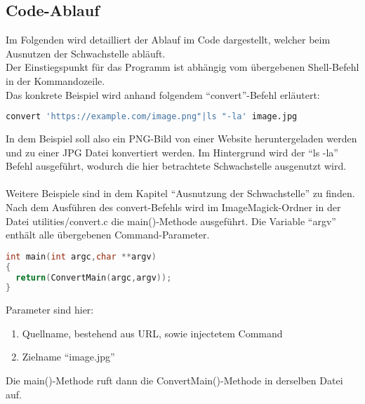 \subsection{Code-Ablauf}\label{subsec:code-ablauf}

Im Folgenden wird detailliert der Ablauf im Code dargestellt, welcher beim Ausnutzen der Schwachstelle abläuft.\\

Der Einstiegspunkt für das Programm ist abhängig vom übergebenen Shell-Befehl in der Kommandozeile.\\

Das konkrete Beispiel wird anhand folgendem "`convert"'-Befehl erläutert:

\begin{lstlisting}[language=Bash, caption=Beispielbefehl Codeablauf,label={lst:codeablaufbeispiel}]
convert 'https://example.com/image.png"|ls "-la' image.jpg
\end{lstlisting}
\vspace{5mm}

In dem Beispiel soll also ein PNG-Bild von einer Website heruntergeladen werden und zu einer JPG Datei konvertiert werden.
Im Hintergrund wird der "`ls -la"' Befehl ausgeführt, wodurch die hier betrachtete Schwachstelle ausgenutzt wird.\\\\
Weitere Beispiele sind in dem Kapitel "`Ausnutzung der Schwachstelle"' zu finden. \\

Nach dem Ausführen des convert-Befehls wird im ImageMagick-Ordner in der Datei utilities/convert.c die main()-Methode ausgeführt.
Die Variable "`argv"' enthält alle übergebenen Command-Parameter.\\

\begin{lstlisting}[firstnumber=90, language=C, caption=utilities/convert.c Einstieg main(),label={lst:lstlisting}]
int main(int argc,char **argv)
{
  return(ConvertMain(argc,argv));
}
\end{lstlisting}
\vspace{5mm}

Parameter sind hier:
\begin{enumerate}
  \item Quellname, bestehend aus URL, sowie injectetem Command
  \item Zielname "`image.jpg"'
\end{enumerate}

Die main()-Methode ruft dann die ConvertMain()-Methode in derselben Datei auf.

